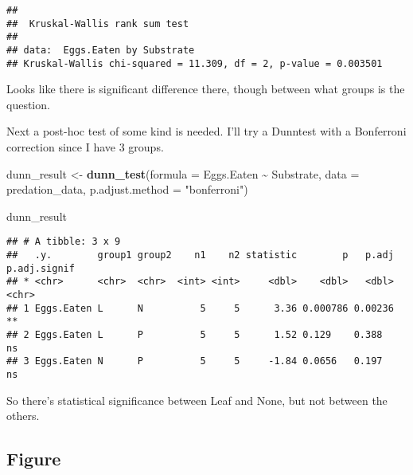 \documentclass[
]{article}
\newenvironment{Shaded}{\begin{snugshade}}{\end{snugshade}}
\newcommand{\AttributeTok}[1]{\textcolor[rgb]{0.13,0.29,0.53}{#1}}
\newcommand{\FunctionTok}[1]{\textcolor[rgb]{0.13,0.29,0.53}{\textbf{#1}}}
\newcommand{\NormalTok}[1]{#1}
\newcommand{\OtherTok}[1]{\textcolor[rgb]{0.56,0.35,0.01}{#1}}
\newcommand{\SpecialCharTok}[1]{\textcolor[rgb]{0.81,0.36,0.00}{\textbf{#1}}}
\newcommand{\StringTok}[1]{\textcolor[rgb]{0.31,0.60,0.02}{#1}}
\begin{document}
\begin{verbatim}
## 
##  Kruskal-Wallis rank sum test
## 
## data:  Eggs.Eaten by Substrate
## Kruskal-Wallis chi-squared = 11.309, df = 2, p-value = 0.003501
\end{verbatim}

Looks like there is significant difference there, though between what
groups is the question.

Next a post-hoc test of some kind is needed. I'll try a Dunntest with a
Bonferroni correction since I have 3 groups.

\begin{Shaded}
\begin{Highlighting}[]
\NormalTok{dunn\_result }\OtherTok{\textless{}{-}} \FunctionTok{dunn\_test}\NormalTok{(}\AttributeTok{formula =}\NormalTok{ Eggs.Eaten }\SpecialCharTok{\textasciitilde{}}\NormalTok{ Substrate, }
                         \AttributeTok{data =}\NormalTok{ predation\_data, }
                         \AttributeTok{p.adjust.method =} \StringTok{"bonferroni"}\NormalTok{)}

\NormalTok{dunn\_result}
\end{Highlighting}
\end{Shaded}

\begin{verbatim}
## # A tibble: 3 x 9
##   .y.        group1 group2    n1    n2 statistic        p   p.adj p.adj.signif
## * <chr>      <chr>  <chr>  <int> <int>     <dbl>    <dbl>   <dbl> <chr>       
## 1 Eggs.Eaten L      N          5     5      3.36 0.000786 0.00236 **          
## 2 Eggs.Eaten L      P          5     5      1.52 0.129    0.388   ns          
## 3 Eggs.Eaten N      P          5     5     -1.84 0.0656   0.197   ns
\end{verbatim}

So there's statistical significance between Leaf and None, but not
between the others.

\subsection{Figure}\label{figure}
\end{document}
